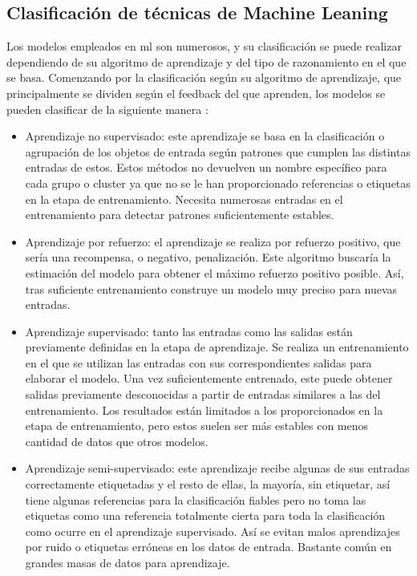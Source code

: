 \subsection{Clasificación de técnicas de Machine Leaning}
\par Los modelos empleados en \gls{ml} son numerosos, y su clasificación se puede realizar dependiendo de su algoritmo de aprendizaje y del tipo de razonamiento en el que se basa. Comenzando por la clasificación según su algoritmo de aprendizaje, que principalmente se dividen según el feedback  del que aprenden, los modelos se pueden clasificar de la siguiente manera \cite{MLRussell}: 
\begin{itemize}
	\item Aprendizaje no supervisado: este aprendizaje se basa en la clasificación o agrupación de los objetos de entrada según patrones que cumplen las distintas entradas de estos. Estos métodos no devuelven un nombre específico para cada grupo o cluster ya que no se le han proporcionado referencias o etiquetas en la etapa de entrenamiento. Necesita numerosas entradas en el entrenamiento para detectar patrones suficientemente estables. 
	\item Aprendizaje por refuerzo: el aprendizaje se realiza por refuerzo positivo, que sería una recompensa, o negativo, penalización. Este algoritmo buscaría la estimación del modelo para obtener el máximo refuerzo positivo posible. Así, tras suficiente entrenamiento construye un modelo muy preciso para nuevas entradas. 
	\item Aprendizaje supervisado: tanto las entradas como las salidas están previamente definidas en la etapa de aprendizaje. Se realiza un entrenamiento en el que se utilizan las entradas con sus correspondientes salidas para elaborar el modelo. Una vez suficientemente entrenado, este puede obtener salidas previamente desconocidas a partir de entradas similares a las del entrenamiento. Los resultados están limitados a los proporcionados en la etapa de entrenamiento, pero estos suelen ser más estables con menos cantidad de datos que otros modelos. 
	\item Aprendizaje semi-supervisado: este aprendizaje recibe algunas de sus entradas correctamente etiquetadas y el resto de ellas, la mayoría, sin etiquetar, así tiene algunas referencias para la clasificación fiables pero no toma las etiquetas como una referencia totalmente cierta para toda la clasificación como ocurre en el aprendizaje supervisado. Así se evitan malos aprendizajes por ruido o etiquetas erróneas en los datos de entrada. Bastante común en grandes masas de datos para aprendizaje. 
\end{itemize}
